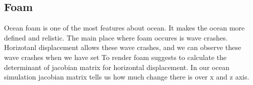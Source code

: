 




\subsection{Foam}
Ocean foam is one of the most features about ocean. It makes the ocean more defined and relistic.
The main place where foam occures is wave crashes. Horizotanl displacement allows these wave crashes, and we can observe these wave crashes when we have set 
To render foam \cite[J. Tessendorf]{tessendorf2001} suggests to calculate the determinant of jacobian matrix for horizontal displacement.
In our ocean simulation jacobian matrix tells us how much change there is over x and z axis.

